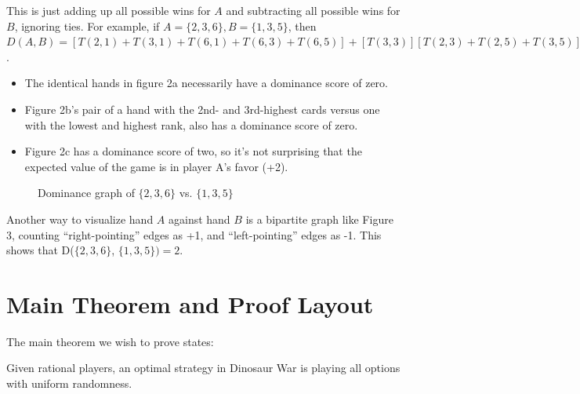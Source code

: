 \documentclass[11pt, oneside]{article} 	%
\begin{document}
This is just adding up all possible wins for $A$ and subtracting all possible wins for $B$, ignoring ties. For example, if $A = \{2, 3,6\}, B = \{1,3,5\}$, then $D(A,B) = [T(2,1) + T(3,1) + T(6,1) + T(6,3) + T(6,5)] + [T(3,3)] [T(2,3) + T(2,5) + T(3,5)] = 5 + 0 - 3 = 2$.


\begin{itemize}
\item The identical hands in figure 2a necessarily have a dominance score of zero.
\item Figure 2b's pair of a hand with the 2nd- and 3rd-highest cards versus one with the lowest and highest rank, also has a dominance score of zero.
\item Figure 2c has a dominance score of two, so it's not surprising that the expected value of the game is in player A's favor (+2).
\end{itemize}


\begin{figure}
\centering
{}
\label{fig:bipartite}
\caption{Dominance graph of $\{2,3,6\}$ vs. $\{1,3,5\}$}
\end{figure}

Another way to visualize hand $A$ against hand $B$ is a bipartite graph like Figure 3, counting ``right-pointing'' edges as +1, and ``left-pointing'' edges as -1. This shows that D($\{2,3,6\}$, $\{1,3,5\}) = 2$.



\section{Main Theorem and Proof Layout}

The main theorem we wish to prove states:

\begin{framed}
Given rational players, an optimal strategy in Dinosaur War is playing all options with uniform randomness.
\end{framed}
\end{document}

